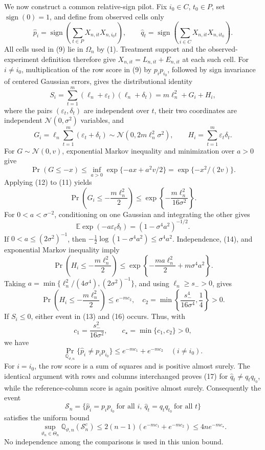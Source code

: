 We now construct a common relative-sign pilot.  Fix \(i_0\in C\), \(t_0\in P\), set \(\operatorname{sign}(0)=1\), and define from observed cells only
\[
\widehat p_i=\operatorname{sign}\!\left(\sum_{t\in P}X_{n,it}X_{n,i_0t}\right),
\qquad
\widehat q_t=\operatorname{sign}\!\left(\sum_{i\in C}X_{n,it}X_{n,it_0}\right).       \tag{9}
\]
All cells used in (9) lie in \(\Omega_n\) by (1).  Treatment support and the observed-experiment definition therefore give \(X_{n,it}=L_{n,it}+E_{n,it}\) at each such cell.  For \(i\ne i_0\), multiplication of the row score in (9) by \(p_ip_{i_0}\), followed by sign invariance of centered Gaussian errors, gives the distributional identity
\[
S_i=\sum_{t=1}^{m}(\ell_n+\varepsilon_t)(\ell_n+\delta_t)
=m\ell_n^2+G_i+H_i,                                      \tag{10}
\]
where the pairs \((\varepsilon_t,\delta_t)\) are independent over \(t\), their two coordinates are independent \(\mathcal N(0,\sigma^2)\) variables, and
\[
G_i=\ell_n\sum_{t=1}^{m}(\varepsilon_t+\delta_t)
\sim\mathcal N(0,2m\ell_n^2\sigma^2),
\qquad H_i=\sum_{t=1}^{m}\varepsilon_t\delta_t.           \tag{11}
\]
For \(G\sim\mathcal N(0,v)\), exponential Markov inequality and minimization over \(a>0\) give
\[
\Pr(G\le-x)\le\inf_{a>0}\exp\{-ax+a^2v/2\}
=\exp\{-x^2/(2v)\}.                                     \tag{12}
\]
Applying (12) to (11) yields
\[
\Pr\!\left(G_i\le-\frac{m\ell_n^2}{2}\right)
\le\exp\!\left\{-\frac{m\ell_n^2}{16\sigma^2}\right\}.             \tag{13}
\]
For \(0<a<\sigma^{-2}\), conditioning on one Gaussian and integrating the other gives
\[
\mathbb E\exp(-a\varepsilon_t\delta_t)
=(1-\sigma^4a^2)^{-1/2}.                                 \tag{14}
\]
If \(0<a\le(2\sigma^2)^{-1}\), then
\(-\tfrac12\log(1-\sigma^4a^2)\le\sigma^4a^2\).  Independence, (14), and exponential Markov inequality imply
\[
\Pr\!\left(H_i\le-\frac{m\ell_n^2}{2}\right)
\le\exp\!\left\{-\frac{ma\ell_n^2}{2}+m\sigma^4a^2\right\}.         \tag{15}
\]
Taking \(a=\min\{\ell_n^2/(4\sigma^4),(2\sigma^2)^{-1}\}\), and using \(\ell_n\ge s_->0\), gives
\[
\Pr\!\left(H_i\le-\frac{m\ell_n^2}{2}\right)\le e^{-mc_2},
\quad
c_2=\min\!\left\{\frac{s_-^4}{16\sigma^4},\frac14\right\}>0.       \tag{16}
\]
If \(S_i\le0\), either event in (13) and (16) occurs.  Thus, with
\[
c_1=\frac{s_-^2}{16\sigma^2},
\qquad c_\star=\min\{c_1,c_2\}>0,
\]
we have
\[
\Pr_{\mathbb Q_{\vartheta,n}}\{\widehat p_i\ne p_ip_{i_0}\}
\le e^{-mc_1}+e^{-mc_2}\quad(i\ne i_0).                  \tag{17}
\]
For \(i=i_0\), the row score is a sum of squares and is positive almost surely.  The identical argument with rows and columns interchanged proves (17) for \(\widehat q_t\ne q_tq_{t_0}\), while the reference-column score is again positive almost surely.  Consequently the event
\[
\mathcal S_n=
\{\widehat p_i=p_ip_{i_0}\ \text{for all }i,
\ \widehat q_t=q_tq_{t_0}\ \text{for all }t\}
\]
satisfies the uniform bound
\[
\sup_{\vartheta_n\in\Theta_n}
\mathbb Q_{\vartheta,n}(\mathcal S_n^c)
\le2(n-1)(e^{-mc_1}+e^{-mc_2})
\le4ne^{-mc_\star}.                                      \tag{18}
\]
No independence among the comparisons is used in this union bound.

